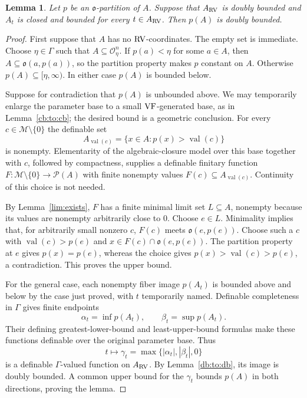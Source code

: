 \documentclass[12pt]{amsart}
\theoremstyle{plain}
\newtheorem{lem}[thm]{Lemma}
\theoremstyle{definition}
\theoremstyle{remark}
\numberwithin{equation}{section}
\theoremstyle{plain}
\newcommand{\VF}{\textup{VF}}
\newcommand{\RV}{\textup{RV}}
\newcommand{\MM}{\mdl M}
\newcommand{\OO}{\mdl O}
\newcommand{\go}{\mathfrak{o}}
\newcommand{\0}{\emptyset}
\newcommand{\mdl}[1]{\mathcal{#1}}  %
\newcommand{\fun}{\longrightarrow}
\newcommand{\efun}{\longmapsto}
\DeclareMathOperator{\vv}{val}
\begin{document}
\begin{lem}\label{vol:par:bounded}
Let $p$ be an $\go$-partition of $A$. Suppose that $A_{\RV}$ is doubly bounded and $A_t$ is closed and bounded for every $t \in A_{\RV}$. Then $p(A)$ is doubly bounded.
\end{lem}
\begin{proof}
{\color{ResolutionGreen}
First suppose that $A$ has no $\RV$-coordinates. The empty set is immediate. Choose $\eta\in\Gamma$ such that $A\subseteq\OO_\eta^n$. If $p(a)<\eta$ for some $a\in A$, then $A\subseteq\go(a,p(a))$, so the partition property makes $p$ constant on $A$. Otherwise $p(A)\subseteq[\eta,\infty)$. In either case $p(A)$ is bounded below.

Suppose for contradiction that $p(A)$ is unbounded above. We may temporarily enlarge the parameter base to a small $\VF$-generated base, as in Lemma~\ref{cb:to:cb}; the desired bound is a geometric conclusion. For every $c\in\MM\setminus\{0\}$ the definable set
\[
A_{\vv(c)}=\{x\in A:p(x)>\vv(c)\}
\]
is nonempty. Elementarity of the algebraic-closure model over this base together with $c$, followed by compactness, supplies a definable finitary function $F:\MM\setminus\{0\}\fun\mdl P(A)$ with finite nonempty values $F(c)\subseteq A_{\vv(c)}$. Continuity of this choice is not needed.

By Lemma~\ref{lim:exists}, $F$ has a finite minimal limit set $L\subseteq A$, nonempty because its values are nonempty arbitrarily close to $0$. Choose $e\in L$. Minimality implies that, for arbitrarily small nonzero $c$, $F(c)$ meets $\go(e,p(e))$. Choose such a $c$ with $\vv(c)>p(e)$ and $x\in F(c)\cap\go(e,p(e))$. The partition property at $e$ gives $p(x)=p(e)$, whereas the choice gives $p(x)>\vv(c)>p(e)$, a contradiction. This proves the upper bound.

For the general case, each nonempty fiber image $p(A_t)$ is bounded above and below by the case just proved, with $t$ temporarily named. Definable completeness in $\Gamma$ gives finite endpoints
\[
\alpha_t=\inf p(A_t),\qquad \beta_t=\sup p(A_t).
\]
Their defining greatest-lower-bound and least-upper-bound formulas make these functions definable over the original parameter base. Thus
\[
t\efun\gamma_t=\max\{|\alpha_t|,|\beta_t|,0\}
\]
is a definable $\Gamma$-valued function on $A_{\RV}$. By Lemma~\ref{db:to:db}, its image is doubly bounded. A common upper bound for the $\gamma_t$ bounds $p(A)$ in both directions, proving the lemma.
}
\end{proof}
\end{document}
